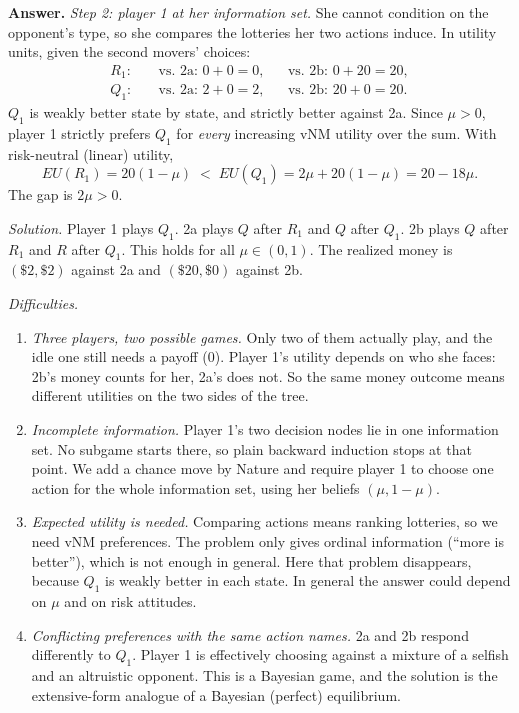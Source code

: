 \documentclass[11pt]{article}
\newenvironment{solution}{\par\smallskip\noindent\textbf{Answer.} }{\par\medskip}
\begin{document}
\begin{description}
\begin{solution}
\emph{Step 2: player 1 at her information set.} She cannot condition on the opponent's type, so she compares the lotteries her two actions induce. In utility units, given the second movers' choices:
\begin{align*}
R_1:&\quad \text{vs.\ 2a: } 0+0=0, &&\text{vs.\ 2b: } 0+20=20,\\
Q_1:&\quad \text{vs.\ 2a: } 2+0=2, &&\text{vs.\ 2b: } 20+0=20.
\end{align*}
$Q_1$ is weakly better state by state, and strictly better against 2a. Since $\mu>0$, player 1 strictly prefers $Q_1$ for \emph{every} increasing vNM utility over the sum. With risk-neutral (linear) utility,
\[
EU(R_1)=20(1-\mu)\;<\;EU(Q_1)=2\mu+20(1-\mu)=20-18\mu.
\]
The gap is $2\mu>0$.

\emph{Solution.} Player 1 plays $Q_1$. 2a plays $Q$ after $R_1$ and $Q$ after $Q_1$. 2b plays $Q$ after $R_1$ and $R$ after $Q_1$. This holds for all $\mu\in(0,1)$. The realized money is $(\$2,\$2)$ against 2a and $(\$20,\$0)$ against 2b.

\emph{Difficulties.}
\begin{enumerate}[itemsep=0pt]
\item \emph{Three players, two possible games.} Only two of them actually play, and the idle one still needs a payoff (0). Player 1's utility depends on who she faces: 2b's money counts for her, 2a's does not. So the same money outcome means different utilities on the two sides of the tree.
\item \emph{Incomplete information.} Player 1's two decision nodes lie in one information set. No subgame starts there, so plain backward induction stops at that point. We add a chance move by Nature and require player 1 to choose one action for the whole information set, using her beliefs $(\mu,1-\mu)$.
\item \emph{Expected utility is needed.} Comparing actions means ranking lotteries, so we need vNM preferences. The problem only gives ordinal information (``more is better''), which is not enough in general. Here that problem disappears, because $Q_1$ is weakly better in each state. In general the answer could depend on $\mu$ and on risk attitudes.
\item \emph{Conflicting preferences with the same action names.} 2a and 2b respond differently to $Q_1$. Player 1 is effectively choosing against a mixture of a selfish and an altruistic opponent. This is a Bayesian game, and the solution is the extensive-form analogue of a Bayesian (perfect) equilibrium.
\end{enumerate}
\end{solution}
\end{description}
\end{document}
